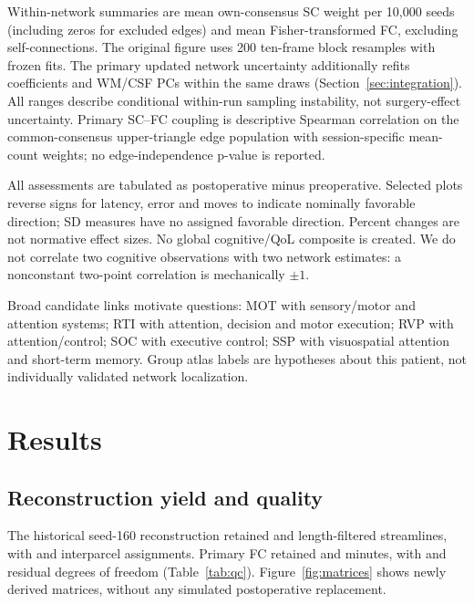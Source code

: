 \documentclass[11pt,a4paper]{article}
\begin{document}
Within-network summaries are mean own-consensus SC weight per 10,000 seeds (including zeros for excluded edges) and mean Fisher-transformed FC, excluding self-connections. The original figure uses 200 ten-frame block resamples with frozen fits. The primary updated network uncertainty additionally refits coefficients and WM/CSF PCs within the same draws (Section~\ref{sec:integration}). All ranges describe conditional within-run sampling instability, not surgery-effect uncertainty. Primary SC--FC coupling is descriptive Spearman correlation on the common-consensus upper-triangle edge population with session-specific mean-count weights; no edge-independence p-value is reported.

All assessments are tabulated as postoperative minus preoperative. Selected plots reverse signs for latency, error and moves to indicate nominally favorable direction; SD measures have no assigned favorable direction. Percent changes are not normative effect sizes. No global cognitive/QoL composite is created. We do not correlate two cognitive observations with two network estimates: a nonconstant two-point correlation is mechanically $\pm1$.

Broad candidate links motivate questions: MOT with sensory/motor and attention systems; RTI with attention, decision and motor execution; RVP with attention/control; SOC with executive control; SSP with visuospatial attention and short-term memory. Group atlas labels are hypotheses about this patient, not individually validated network localization.

\section{Results}
\subsection{Reconstruction yield and quality}
The historical seed-160 reconstruction retained \PreStreamlines{} and \PostStreamlines{} length-filtered streamlines, with \PreAssigned{} and \PostAssigned{} interparcel assignments. Primary FC retained \PreMinutes{} and \PostMinutes{} minutes, with \PreDof{} and \PostDof{} residual degrees of freedom (Table~\ref{tab:qc}). Figure~\ref{fig:matrices} shows newly derived matrices, without any simulated postoperative replacement.
\begin{table}[H]\centering\small
\caption{Historical seed-160 reconstruction yield, primary consensus support and FC QC. FD is the saved Euler-based approximation; SC--FC correlations are descriptive.}\label{tab:qc}\end{table}
\end{document}
